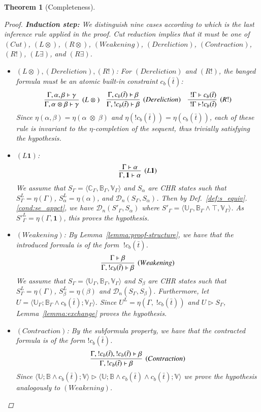 \documentclass[acmtocl]{acmtrans2m}
\newtheorem{theorem}{Theorem}[section]
\newcommand\state[1]{\langle #1 \rangle}
\newcommand\ent{\rhd}
\newcommand{\B}{\ensuremath{\mathbb{B}}}
\newcommand{\U}{\ensuremath{\mathbb{U}}}
\newcommand{\C}{\ensuremath{\mathbb{C}}}
\newcommand{\V}{\ensuremath{\mathbb{V}}}
\newcommand{\cD}{\ensuremath{\mathcal{D}}}
\newcommand{\cb}{\ensuremath{c_b(\bar t)}}
\newcommand{\x}{{\;\otimes\;}}
\newcommand{\bang}{\; !}
\newcommand{\lone}{\boldsymbol{1}}
\begin{document}
\begin{theorem}[Completeness]
\begin{proof}
	\textbf{Induction step:} We distinguish nine cases according to
	which is the last inference rule applied in the proof. Cut reduction
	implies that it must be one of $(Cut)$, $(L\otimes)$, $(R\otimes)$,
	$(Weakening)$, $(Dereliction)$, $(Contraction)$, $(R!)$, $(L\exists)$,
	and $(R\exists)$.
	\begin{itemize}
	\item $(L\otimes),(Dereliction),(R!)$: For $(Dereliction)$ and $(R!)$,
	the banged formula must be an atomic built-in constraint $\cb$:
	\[
		\infer[(L\x)]
			{\Gamma,\alpha\x \beta\vdash\gamma}
			{\Gamma,\alpha,\beta\vdash\gamma}
		\quad
		\infer[(Dereliction)]
			{\Gamma,!\cb\vdash\beta}
			{\Gamma,\cb\vdash\beta}
		\quad
		\infer[(R!)]
		{\bang\Gamma\vdash !\cb}
		{\bang\Gamma\vdash \cb}
	\]
	Since $\eta(\alpha,\beta)=\eta(\alpha\x\beta)$ and $\eta(!\cb)=\eta(\cb)$, each
	of these rule is invariant to the $\eta$-completion of the sequent, thus
	trivially satisfying the hypothesis.
	\item $(L\lone)$:
	\[
		\infer[(L\lone)]
			{\Gamma,\lone\vdash\alpha}
			{\Gamma \vdash \alpha}
	\]
	We assume that $S_\Gamma=\state{\C_\Gamma,\B_\Gamma,\V_\Gamma}$ and $S_\alpha$
	are CHR states such that $S^L_\Gamma=\eta(\Gamma)$, $S^L_\alpha=\eta(\alpha)$,
	and $\cD_n(S_\Gamma,S_\alpha)$. Then by
	Def.~\ref{def:s_equiv}.\ref{cond:se_appct}, we have
	$\cD_n(S'_\Gamma,S_\alpha)$ where
	$S'_\Gamma=\state{\U_\Gamma,\B_\Gamma\wedge\top,\V_\Gamma}$. As
	${S'}^L_\Gamma=\eta(\Gamma,\lone)$, this proves the hypothesis.
	\item $(Weakening)$: By Lemma~\ref{lemma:proof-structure}, we have that the
	introduced formula is of the form $\bang\cb$.
	\[
		\infer[(Weakening)]
			{\Gamma, !\cb\vdash\beta}
			{\Gamma\vdash\beta}
	\]
	We assume that $S_\Gamma=\state{\U_\Gamma,\B_\Gamma,\V_\Gamma}$ and $S_\beta$ are
	CHR states such that $S^L_\Gamma=\eta(\Gamma)$, $S^L_\beta=\eta(\beta)$ and
	$\cD_n(S_\Gamma,S_\beta)$. Furthermore,
	let $U=\state{\U_\Gamma;\B_\Gamma\wedge \cb;\V_\Gamma}$. Since
	$U^L=\eta(\Gamma,\bang \cb)$ and $U\ent S_\Gamma$,
	Lemma~\ref{lemma:exchange} proves the hypothesis.
	  \item $(Contraction)$: By the subformula property, we have that the
contracted
	  formula is of the form $!\cb$.
	  \[
	  \infer[(Contraction)]{\Gamma,!\cb\vdash\beta}
	      {\Gamma,!\cb,!\cb\vdash\beta}
	  \]
	  Since $\state{\U;\B\wedge \cb;\V}\ent\state{\U;\B\wedge\cb \wedge
\cb;\V}$
	  we prove the hypothesis analogously to $(Weakening)$.


\end{itemize}
\end{proof}
\end{theorem}
\end{document}
